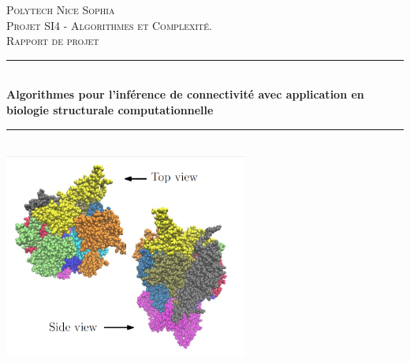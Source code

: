 \documentclass[11pt]{article}
\begin{document}

\begin{titlepage} %
	\newcommand{\HRule}{\rule{\linewidth}{0.5mm}} %
	
	\center %
	
	
	\textsc{\LARGE Polytech Nice Sophia}\\[1.5cm] %
	
	\textsc{\Large Projet SI4 - Algorithmes et Complexité.}\\[0.5cm] %
	
	\textsc{\large Rapport de projet}\\[0.5cm] %
	
	
	\HRule\\[0.4cm]
	
	{\huge\bfseries Algorithmes pour l'inférence de connectivité avec application en biologie structurale computationnelle}\\[0.4cm] %
	
	\HRule\\[0.6cm]

		
	
	\vfill
	\includegraphics[width=0.6\textwidth]{complex.png}\\[1cm] %
	

\end{titlepage}
\end{document}
